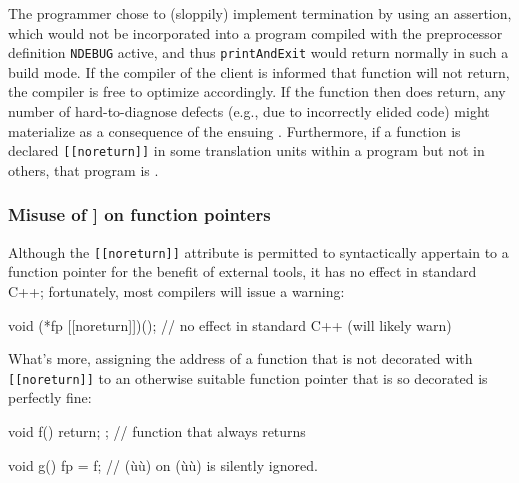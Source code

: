 \noindent The programmer chose to (sloppily) implement termination by using an
assertion, which would not be incorporated into a program compiled with
the preprocessor definition \lstinline!NDEBUG! active, and thus
\lstinline!printAndExit! would return normally in such a build mode. If the
compiler of the client is informed that function will not return, the compiler is
free to optimize accordingly. If the function then does return, any
number of hard-to-diagnose defects (e.g., due to incorrectly elided
code) might materialize as a consequence of the ensuing
. Furthermore, if a function is declared \lstinline![[noreturn]]! in some
translation units within a program but not in others, that program is
.

\subsubsection[Misuse of {\tt[[noreturn]]} on function pointers]{Misuse of {\SubsubsecCode [[noreturn]]} on function pointers}\label{misuse-of-[[noreturn]]-on-function-pointers}

Although the \lstinline![[noreturn]]! attribute is permitted to syntactically appertain
to a function pointer for the benefit of external tools,
it has no effect in standard C++; fortunately, most compilers will issue a warning:

\begin{emcppslisting}[emcppsbatch=e6]
void (*fp [[noreturn]])();  // no effect in standard C++ (will likely warn)
\end{emcppslisting}

\noindent What's more, assigning the address of a function
that is not decorated with \lstinline![[noreturn]]! to an otherwise
suitable function pointer that is so decorated is perfectly fine:

\begin{emcppslisting}[emcppsbatch=e6]
void f() { return; };  // function that always returns

void g()
{
    fp = f;  // (ù{\codeincomments{[[noreturn]]}}ù) on (ù{}ù) is silently ignored.
}
\end{emcppslisting}

